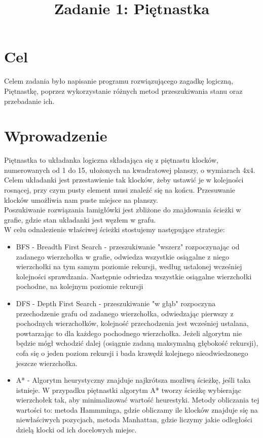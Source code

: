 \documentclass{classrep}
\author{
  \studentinfo{Maciej Pracucik}{216869} \and
  \studentinfo{Adam Jóźwiak}{216786}
}
\title{\textbf{Zadanie 1: Piętnastka}}
\begin{document}
\maketitle

\section{Cel}
{
Celem zadania było napisanie programu rozwiązującego zagadkę logiczną, 
Piętnastkę, poprzez wykorzystanie różnych metod przeszukiwania stanu oraz przebadanie ich.}

\section{Wprowadzenie}
{
Piętnastka to układanka logiczna składająca się z piętnastu klocków, numerowanych od 1 do 15, ułożonych na kwadratowej planszy,
o wymiarach 4x4. Celem układanki jest przestawienie tak klocków, żeby ustawić je w kolejności rosnącej, przy czym pusty element musi znaleźć się na końcu. Przesuwanie klocków umożliwia nam puste miejsce na planszy.\\
Poszukiwanie rozwiązania łamigłówki jest zbliżone do znajdowania ścieżki w grafie, gdzie stan układanki jest węzłem w grafu.\\ 
W celu odnalezienie właściwej ścieżki stostujemy następujące strategie:\\
\begin{itemize}
	\item BFS - Breadth First Search - przeszukiwanie "wszerz" rozpoczynając od zadanego wierzchołka w grafie, odwiedza wszystkie osiągalne z niego wierzchołki na tym samym poziomie rekursji, według ustalonej wcześniej kolejności sprawdzania. Następnie odwiedza wszystkie osiągalne wierzchołki pochodne, na kolejnym poziomie rekursji
	\item DFS - Depth First Search - przeszukiwanie "w głąb" rozpoczyna przechodzenie grafu od zadanego wierzchołka, odwiedzając pierwszy z pochodnych wierzchołków, kolejność przechodzenia jest wcześniej ustalana, powtarzając to dla każdego pochodnego wierzchołka. Jeżeli algorytm nie będzie mógł wchodzić dalej (osiągnie zadaną maksymalną głębokość rekursji), cofa się o jeden poziom rekursji i bada krawędź kolejnego nieodwiedzonego jeszcze wierzchołka.
	\item A* - Algorytm heurystyczny znajduje najkrótsza mozliwą ścieżkę, jeśli taka istnieje. W przypadku piętnastki algorytm A* tworzy ścieżkę wybierając wierzchołek tak, aby minimalizować wartość heurestyki. Metody obliczania tej wartości to: metoda Hammminga, gdzie obliczamy ile klocków znajduje się na niewłaściwych pozycjach, metoda Manhattan, gdzie liczymy jakie odległości dzielą klocki od ich docelowych miejsc.
\end{itemize}
}
\end{document}
